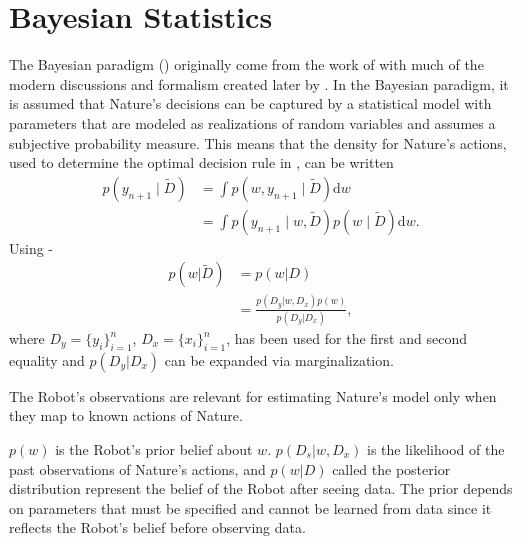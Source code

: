 \section{Bayesian Statistics}
The Bayesian paradigm () originally come from the work of \citet{Bayes:63,laplace_thorie_1812} with much of the modern discussions and formalism created later by \citet{Finetti1937LaP,Jeffreys1940,Savage1954}.\newline
In the Bayesian paradigm, it is assumed that Nature's decisions can be captured by a statistical model with parameters that are modeled as realizations of random variables and assumes a subjective probability measure. This means that the density for Nature's actions, used to determine the optimal decision rule in , can be written
\begin{equation}
	\begin{split}
		p(y_{n+1}\mid \tilde{D}) &= \int p(w,y_{n+1}\mid \tilde{D}) \mathrm{d}w\\
		& = \int p(y_{n+1}\mid w,\tilde{D})p(w\mid \tilde{D}) \mathrm{d}w.
	\end{split}
	\label{eq:hest1}
\end{equation}
Using -
\begin{equation}
	\begin{split}
		p(w|\tilde{D}) &= p(w|D)\\
		&= \frac{p(D_y|w,D_x)p(w)}{p(D_y|D_x)},
	\end{split}
	\label{eq:pa2}
\end{equation}
where $D_y= \{y_i\}_{i=1}^n$, $D_x = \{x_i\}_{i=1}^n$,  has been used for the first and second equality and $p(D_y|D_x)$ can be expanded via marginalization.

\begin{axiom}
	\label{ax:observation_relevance}
	The Robot's observations are relevant for estimating Nature's model only when they map to known actions of Nature.
\end{axiom}

$p(w)$ is the Robot's prior belief about $w$. $p(D_s|w,D_x)$ is the likelihood of the past observations of Nature's actions, and $p(w|D)$ called the posterior distribution represent the belief of the Robot after seeing data. The prior depends on parameters that must be specified and cannot be learned from data since it reflects the Robot's belief before observing data.

